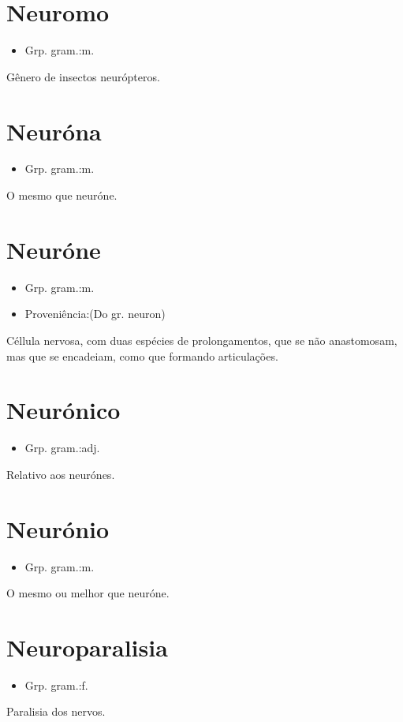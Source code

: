 \section{Neuromo}
\begin{itemize}
\item {Grp. gram.:m.}
\end{itemize}
Gênero de insectos neurópteros.
\section{Neuróna}
\begin{itemize}
\item {Grp. gram.:m.}
\end{itemize}
O mesmo que \textunderscore neuróne\textunderscore .
\section{Neuróne}
\begin{itemize}
\item {Grp. gram.:m.}
\end{itemize}
\begin{itemize}
\item {Proveniência:(Do gr. \textunderscore neuron\textunderscore )}
\end{itemize}
Céllula nervosa, com duas espécies de prolongamentos, que se não anastomosam, mas que se encadeiam, como que formando articulações.
\section{Neurónico}
\begin{itemize}
\item {Grp. gram.:adj.}
\end{itemize}
Relativo aos neurónes.
\section{Neurónio}
\begin{itemize}
\item {Grp. gram.:m.}
\end{itemize}
O mesmo ou melhor que \textunderscore neuróne\textunderscore .
\section{Neuroparalisia}
\begin{itemize}
\item {Grp. gram.:f.}
\end{itemize}
Paralisia dos nervos.
